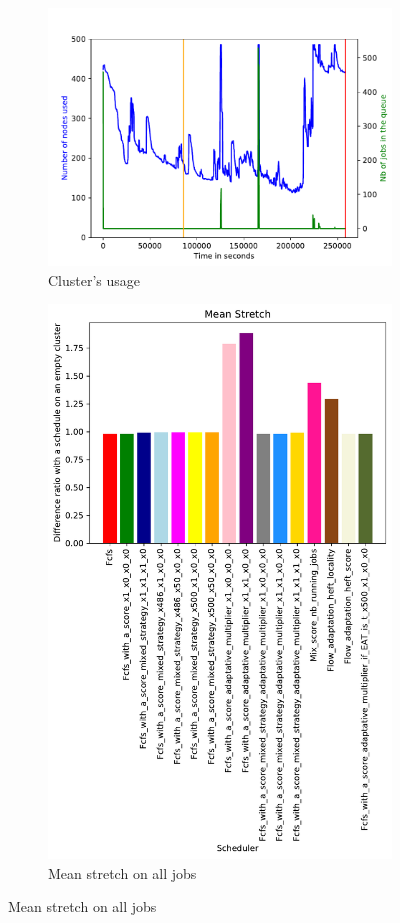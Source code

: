 \documentclass[a4paper]{article}
\begin{document}
\begin{figure}[H]\centering
\begin{subfigure}[b]{0.4\linewidth}\centering\includegraphics[width=1\linewidth]{MBSS/plot/2022-07-17->2022-07-18_V9271_Fcfs_Used_nodes_450_128_32_256_4_1024.pdf}\caption{Cluster's usage}\end{subfigure}
\begin{subfigure}[b]{0.4\linewidth}\centering\includegraphics[width=0.9\linewidth]{MBSS/plot/Results_FCFS_Score_Adaptative_Multiplier_2022-07-17->2022-07-18_V9271_Mean_Stretch_450_128_32_256_4_1024.pdf}\caption{Mean stretch on all jobs}\end{subfigure}

\end{figure}
\end{document}
